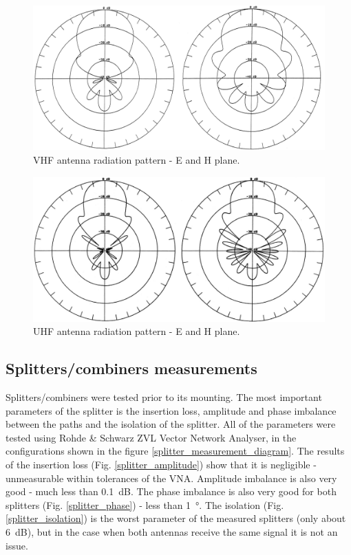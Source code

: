 \begin{figure}
    \centering
    \includegraphics[width=0.75\paperwidth]{img/7/radiation_144.png}
    \caption{VHF antenna radiation pattern - E and H plane.}
    \label{radiation_144}
\end{figure}

\begin{figure}
    \centering
    \includegraphics[width=0.75\paperwidth]{img/7/radiation_435.png}
    \caption{UHF antenna radiation pattern - E and H plane.}
    \label{radiation_435}
\end{figure}



\subsection{Splitters/combiners measurements}
Splitters/combiners were tested prior to its mounting. The most important parameters of the splitter is the insertion loss, amplitude and phase imbalance between the paths and the isolation of the splitter. All of the parameters were tested using Rohde \& Schwarz ZVL Vector Network Analyser, in the configurations shown in the figure \ref{splitter_measurement_diagram}. The results of the insertion loss (Fig. \ref{splitter_amplitude}) show that it is negligible - unmeasurable within tolerances of the VNA. Amplitude imbalance is also very good - much less than \SI{0.1}{\dB}. The phase imbalance is also very good for both splitters (Fig. \ref{splitter_phase}) - less than \SI{1}{\degree}. The isolation (Fig. \ref{splitter_isolation}) is the worst parameter of the measured splitters (only about \SI{6}{\dB}), but in the case when both antennas receive the same signal it is not an issue.

